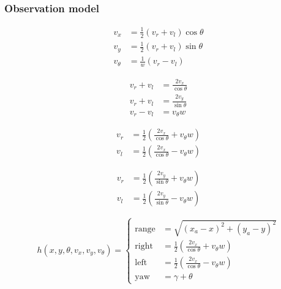 \documentclass[oneside, 12pt, a4paper]{book}
\begin{document}
\subsubsection{Observation model}

\begin{equation}
    \begin{split}
        v_x &= \frac{1}{2}(v_r+v_l)\cos\theta \\
        v_y &= \frac{1}{2}(v_r+v_l)\sin\theta \\
        v_\theta &= \frac{1}{w} (v_r-v_l) 
    \end{split}
\end{equation}

\begin{equation}
    \begin{split}
        v_r + v_l &= \frac{2 v_x}{\cos\theta} \\
        v_r + v_l &= \frac{2 v_y}{\sin\theta} \\
        v_r - v_l &= v_\theta w
    \end{split}
\end{equation}

\begin{equation}
    \begin{split}
        v_r &= \frac{1}{2}\left( \frac{2 v_x}{\cos\theta} + v_\theta w\right) \\
        v_l &= \frac{1}{2}\left( \frac{2 v_x}{\cos\theta} - v_\theta w\right)
    \end{split}
\end{equation}

\begin{equation}
    \begin{split}
        v_r &= \frac{1}{2}\left( \frac{2 v_y}{\sin\theta} + v_\theta w\right) \\
        v_l &= \frac{1}{2}\left( \frac{2 v_y}{\sin\theta} - v_\theta w\right)
    \end{split}
\end{equation}

\begin{equation}
    h(x,y,\theta, v_x, v_y, v_\theta) = 
    \begin{cases}
        \text{range} &= \sqrt{(x_a - x)^2 + (y_a-y)^2}\\
        \text{right} &= \frac{1}{2}\left( \frac{2 v_x}{\cos\theta} + v_\theta w\right) \\
        \text{left} &= \frac{1}{2}\left( \frac{2 v_x}{\cos\theta} - v_\theta w\right) \\
        \text{yaw} &= \gamma + \theta
      \end{cases}
\end{equation}
\end{document}
